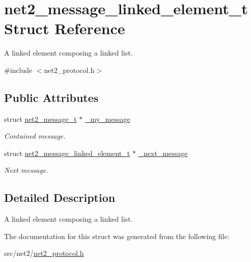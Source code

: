 \hypertarget{structnet2__message__linked__element__t}{}\section{net2\+\_\+message\+\_\+linked\+\_\+element\+\_\+t Struct Reference}
\label{structnet2__message__linked__element__t}


A linked element composing a linked list.  




{\ttfamily \#include $<$net2\+\_\+protocol.\+h$>$}

\subsection*{Public Attributes}
\begin{DoxyCompactItemize}
\item 
\hypertarget{structnet2__message__linked__element__t_a6ef66e03a7c837615a5fc44d05e10da9}{}struct \hyperlink{structnet2__message__t}{net2\+\_\+message\+\_\+t} $\ast$ \hyperlink{structnet2__message__linked__element__t_a6ef66e03a7c837615a5fc44d05e10da9}{\+\_\+my\+\_\+message}\label{structnet2__message__linked__element__t_a6ef66e03a7c837615a5fc44d05e10da9}

\begin{DoxyCompactList}\small\item\em Contained message. \end{DoxyCompactList}\item 
\hypertarget{structnet2__message__linked__element__t_a4456c5695189635ab7db61a66a706e03}{}struct \hyperlink{structnet2__message__linked__element__t}{net2\+\_\+message\+\_\+linked\+\_\+element\+\_\+t} $\ast$ \hyperlink{structnet2__message__linked__element__t_a4456c5695189635ab7db61a66a706e03}{\+\_\+next\+\_\+message}\label{structnet2__message__linked__element__t_a4456c5695189635ab7db61a66a706e03}

\begin{DoxyCompactList}\small\item\em Next message. \end{DoxyCompactList}\end{DoxyCompactItemize}


\subsection{Detailed Description}
A linked element composing a linked list. 

The documentation for this struct was generated from the following file\+:\begin{DoxyCompactItemize}
\item 
src/net2/\hyperlink{net2__protocol_8h}{net2\+\_\+protocol.\+h}\end{DoxyCompactItemize}
